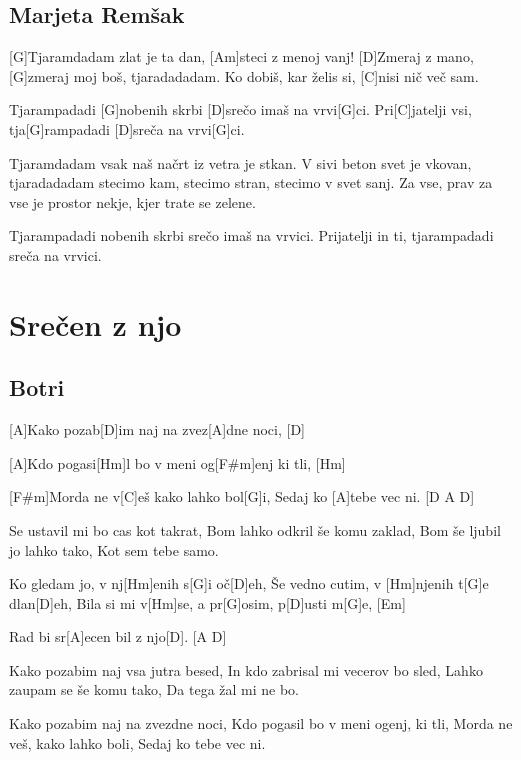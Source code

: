 \documentclass[a4paper,12pt]{article}
\begin{document}
\begin{multicols}{2}
\subsection*{Marjeta Remšak}
\begin{guitar}

[G]Tjaramdadam zlat je ta dan, 
[Am]steci z menoj vanj! 
[D]Zmeraj z mano, 
[G]zmeraj moj boš, tjaradadadam. 
Ko dobiš, kar želis si, 
[C]nisi nič več sam. 


Tjarampadadi 
[G]nobenih skrbi 
[D]srečo imaš na vrvi[G]ci. 
Pri[C]jatelji vsi, tja[G]rampadadi 
[D]sreča na vrvi[G]ci. 


Tjaramdadam vsak naš 
načrt iz vetra je stkan. 
V sivi beton 
svet je vkovan, tjaradadadam 
stecimo kam, 
stecimo stran, 
stecimo v svet sanj. 
Za vse, prav za vse 
je prostor nekje, 
kjer trate se zelene. 


Tjarampadadi 
nobenih skrbi 
srečo imaš na vrvici. 
Prijatelji in ti, tjarampadadi 
sreča na vrvici. 

\end{guitar}
\section{Srečen z njo}
\subsection*{Botri}
\begin{guitar}
[D A]

[A]Kako pozab[D]im naj na zvez[A]dne  noci, [D]

[A]Kdo pogasi[Hm]l bo v meni og[F#m]enj  ki  tli, [Hm]

[F#m]Morda ne v[C]eš kako lahko bol[G]i,
Sedaj ko [A]tebe vec ni. [D A D]


Se ustavil mi bo cas kot takrat,
Bom lahko odkril še komu zaklad,
Bom še ljubil jo lahko tako,
Kot sem tebe samo.


Ko gledam jo, v nj[Hm]enih s[G]i oč[D]eh,
Še vedno cutim, v [Hm]njenih t[G]e  dlan[D]eh,
Bila si mi v[Hm]se, a pr[G]osim, p[D]usti  m[G]e, [Em]

Rad bi sr[A]ecen bil z njo[D]. [A D]

     
Kako pozabim naj vsa jutra besed,
In kdo zabrisal mi vecerov bo sled,
Lahko zaupam se še komu tako,
Da tega žal mi ne bo.


Kako pozabim naj na zvezdne noci,
Kdo pogasil bo v meni ogenj, ki tli,
Morda ne veš, kako lahko boli,
Sedaj ko tebe vec ni.



\end{guitar}
\end{multicols}
\end{document}
